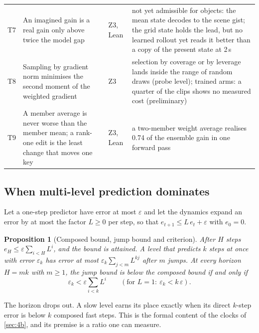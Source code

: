 \documentclass[10pt,twocolumn]{article}
\newtheorem{proposition}{Proposition}
\theoremstyle{remark}
\begin{document}
\begin{table}[t]
\begin{tabularx}{\textwidth}{@{}l>{\raggedright\arraybackslash}p{60mm}l>{\raggedright\arraybackslash}X@{}}
T7 & An imagined gain is a real gain only above twice the model gap & Z3, Lean &
not yet admissible for objects: the mean state decodes to the scene gist; the grid state holds the lead, but no learned rollout yet reads it better than a copy of the present state at 2\,s \\
T8 & Sampling by gradient norm minimises the second moment of the weighted gradient & Z3 &
selection by coverage or by leverage lands inside the range of random draws (probe level); trained arms: a quarter of the clips shows no measured cost (preliminary) \\
T9 & A member average is never worse than the member mean; a rank-one edit is the least change that moves one key & Z3, Lean &
a two-member weight average realises 0.74 of the ensemble gain in one forward pass \\
\bottomrule
\end{tabularx}
\end{table}

\subsection{When multi-level prediction dominates}
Let a one-step predictor have error at most $\varepsilon$ and let the dynamics expand an error by at most the factor $L\ge0$ per
step, so that $e_{t+1}\le L\,e_t+\varepsilon$ with $e_0=0$.
\begin{proposition}[Composed bound, jump bound and criterion]\label{prop:jump}
After $H$ steps $e_H\le\varepsilon\sum_{i<H}L^{i}$, and the bound is attained. A level that predicts $k$ steps at once with error
$\varepsilon_k$ has error at most $\varepsilon_k\sum_{j<m}L^{kj}$ after $m$ jumps. At every horizon $H=mk$ with $m\ge1$, the jump bound
is below the composed bound if and only if
\begin{equation}
\varepsilon_k<\varepsilon\sum_{i<k}L^{i}\qquad(\text{for }L=1:\ \varepsilon_k<k\,\varepsilon).\label{eq:jump}
\end{equation}
\end{proposition}
\noindent The horizon drops out. A slow level earns its place exactly when its direct $k$-step error is below $k$ composed fast
steps. This is the formal content of the clocks of \cref{sec:4b}, and its premise is a ratio one can measure.
\end{document}
